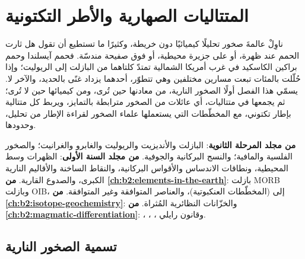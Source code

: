 \chapter{المتتاليات الصهارية والأطر التكتونية}\label{ch:b2:magmatic-series}

ناوِلْ عالمةَ صخور تحليلًا كيميائيًا دون خريطة، وكثيرًا ما تستطيع أن تقول هل
ثارت الحمم عند ظهرة، أو على جزيرة محيطية، أو فوق صفيحة مندسّة. فحمم
آيسلندا وحمم براكين الكاسكيد في غرب أمريكا الشمالية تمتدّ كلتاهما
من البازلت إلى الريوليت؛ وإذا حُلّلت بالمئات تبعت مسارين مختلفين وهي
تتطوّر، أحدهما يزداد غنًى بالحديد، والآخر لا. يسمّي هذا الفصل أولًا
الصخور النارية، من معادنها حين تُرى، ومن
كيميائها حين لا تُرى؛ ثم يجمعها في متتاليات، أي عائلات من الصخور
مترابطة بالتمايز، ويربط كل متتالية بإطار تكتوني، مع
المخطّطات التي يستعملها علماء الصخور لقراءة الإطار من تحليل، وحدودها.

\begin{recall}
\textbf{من مجلد المرحلة الثانوية}: البازلت والأنديزيت والريوليت والغابرو والغرانيت؛
والصخور الفلسية والمافية؛ والنسج البركانية والجوفية. \textbf{من مجلد السنة
الأولى}: الظهرات وسط المحيطية، ونطاقات الاندساس والأقواس البركانية، والنقاط الساخنة
والأقاليم النارية الكبرى، والصدوع القارية. \textbf{من \cref{ch:b2:elements-in-the-earth}}:
بازلت MORB وبازلت OIB،  إلى  (المخطّطات العنكبوتية)، والعناصر المتوافقة
وغير المتوافقة. \textbf{من \cref{ch:b2:isotope-geochemistry}}:  والخزّانات النظائرية المُثراة. \textbf{من
\cref{ch:b2:magmatic-differentiation}}: ، ، ، وقانون رايلي.
\end{recall}

\section{تسمية الصخور النارية}\label{sec:b2:magmatic-series:naming}

